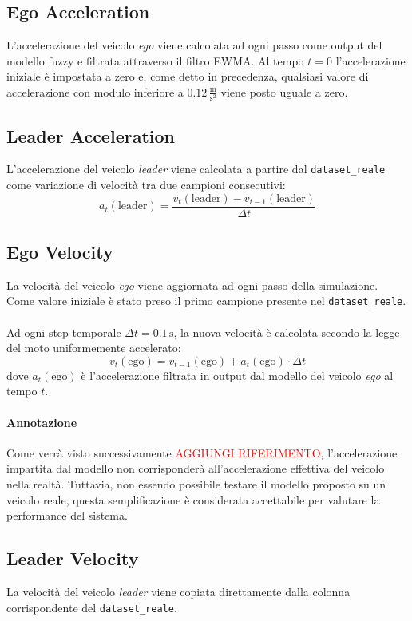 \subsection{Ego Acceleration}
L'accelerazione del veicolo \emph{ego} viene calcolata ad ogni passo come output del modello fuzzy e filtrata attraverso il filtro EWMA.  
Al tempo $t=0$ l'accelerazione iniziale è impostata a zero e, come detto in precedenza, qualsiasi valore di accelerazione con modulo
inferiore a $0.12 \,\frac{\mathrm{m}}{\mathrm{s^2}}$ viene posto uguale a zero.


\subsection{Leader Acceleration}
L'accelerazione del veicolo \emph{leader} viene calcolata a partire dal \texttt{dataset\_reale} come 
variazione di velocità tra due campioni consecutivi:
\[
a_t(\mathrm{leader}) = \frac{v_t(\mathrm{leader}) - v_{t-1}(\mathrm{leader})}{\Delta t}
\]

\subsection{Ego Velocity}
La velocità del veicolo \emph{ego} viene aggiornata ad ogni passo della simulazione.
Come valore iniziale è stato preso il primo campione presente nel \texttt{dataset\_reale}.  
\\\\
\noindent Ad ogni step temporale $\Delta t = 0.1\,\mathrm{s}$, la nuova velocità è calcolata secondo la legge del moto uniformemente 
accelerato:
\[
v_t(\mathrm{ego}) = v_{t-1}(\mathrm{ego}) + a_t(\mathrm{ego}) \cdot \Delta t
\]
dove $a_t(\mathrm{ego})$ è l'accelerazione filtrata in output dal modello del veicolo \emph{ego} al tempo $t$.

\paragraph{Annotazione} Come verrà visto successivamente \textcolor{red}{AGGIUNGI RIFERIMENTO}, l'accelerazione impartita dal modello 
non corrisponderà all'accelerazione effettiva del veicolo nella realtà. Tuttavia, non essendo possibile testare il modello proposto 
su un veicolo reale, questa semplificazione è considerata accettabile per valutare la performance del sistema.

\subsection{Leader Velocity}
La velocità del veicolo \emph{leader} viene copiata direttamente dalla colonna corrispondente del \texttt{dataset\_reale}.

